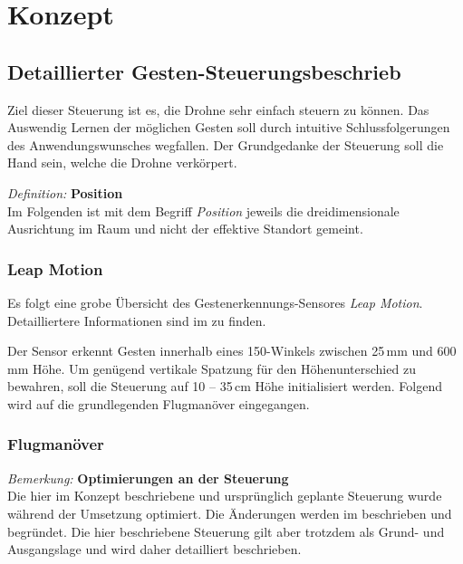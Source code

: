 \chapter{Konzept}

\section{Detaillierter Gesten-Steuerungsbeschrieb}
\label{sec:gestureControll}

Ziel dieser Steuerung ist es, die Drohne sehr einfach steuern zu können.
Das Auswendig Lernen der möglichen Gesten soll durch intuitive Schlussfolgerungen des Anwendungswunsches wegfallen.
Der Grundgedanke der Steuerung soll die Hand sein, welche die Drohne verkörpert.

\begin{framed}
\textit{Definition: }\textbf{Position}\\
Im Folgenden ist mit dem Begriff \textit{Position} jeweils die dreidimensionale Ausrichtung im Raum und nicht der effektive Standort gemeint.
\end{framed}

\subsection{Leap Motion}
Es folgt eine grobe Übersicht des Gestenerkennungs-Sensores \textit{Leap Motion}.
Detailliertere Informationen sind im  zu finden.

Der Sensor erkennt Gesten innerhalb eines 150\textdegree-Winkels zwischen 25\,mm und 600\,mm Höhe.
Um genügend vertikale Spatzung für den Höhenunterschied zu bewahren, soll die Steuerung auf 10 --  35\,cm Höhe initialisiert werden.
Folgend wird auf die grundlegenden Flugmanöver eingegangen.

\subsection{Flugmanöver}
\begin{framed}
	\textit{Bemerkung: }\textbf{Optimierungen an der Steuerung}\\
	Die hier im Konzept beschriebene und ursprünglich geplante Steuerung wurde während der Umsetzung optimiert. Die Änderungen werden im  beschrieben und begründet. Die hier beschriebene Steuerung gilt aber trotzdem als Grund- und Ausgangslage und wird daher detailliert beschrieben.
\end{framed}

